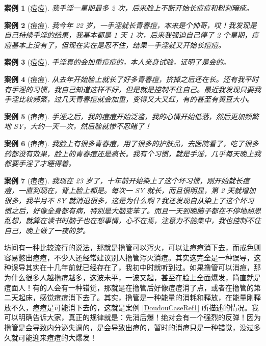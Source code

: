 \documentclass{ctexart}
\newtheorem{case}{案例}
\begin{document}
\begin{case}[痘痘]\it
    我手淫一星期最多 2 次，后来脸上不断开始长痘痘和粉刺暗疮。
\end{case}

\begin{case}[痘痘]\it
    我今年 22 岁，一手淫就长青春痘，本来是个帅哥，哎！我发现是自己持续手淫的结果，我基本都是 1 天 1 次，后来我强迫自己停了 2 个星期，痘痘基本上没有了，但现在实在是忍不住，结果一手淫就又开始长痘痘。
\end{case}

\begin{case}[痘痘]\it
    手淫真的会加重痘痘的，本人亲身试验，证明了是会的。
\end{case}

\begin{case}[痘痘]\it
    从去年开始脸上就长了好多青春痘，挤掉之后还在长。还有我平时有手淫的习惯，我自己知道这样不好，但是就是控制不住自己。最近我发现只要我手淫比较频繁，过几天青春痘就会加重，变得又大又红，有的甚至有黄豆大小。
\end{case}

\begin{case}[痘痘]\it
    手淫之后，我的痘痘开始泛滥，我的心情开始低落，然后更加频繁地 SY，大约一天一次，然后脸就惨不忍睹了！
\end{case}

\begin{case}[痘痘]\it
    我脸上有很多青春痘，用了很多的护肤品，去医院看了，吃了很多药都没有效果，脸上的青春痘还是疯长。我有个习惯，就是手淫，几乎每天晚上我都要手淫了才睡得着。
\end{case}

\begin{case}[痘痘]\it
    我现在 23 岁了，十年前开始染上了这个坏习惯，刚开始就长痘痘，一直到现在，背上脸上都是。每次一 SY 就长，而且很明显，第 2 天就增加很多，我半月不 SY 就消退很多，这是为什么啊？我还发现自从染上了这个坏习惯之后，好像全身都有病，特别是大脑变笨了。而且一天到晚脑子都在不停地胡思乱想，就算在读书时脑子也在想事情，心不在焉，注意力不能集中，我也控制不住自己，晚上做了一夜的梦。
\end{case}

坊间有一种比较流行的说法，那就是撸管可以泻火，可以让痘痘消下去，而戒色则容易憋出痘痘，不少人还经常建议别人撸管泻火消痘。其实这完全是一种误导，这种误导其实在十几年前就已经存在了，我初中时就听到过。如果撸管可以消痘，那为什么很多人越撸痘越多，这波未平，一波又起，甚至在脸上全面爆发，简直就是痘面人！有的人会有一种错觉，那就是在撸管后好像痘痘消了点，或者在撸管的第二天起床，感觉痘痘消下去了。其实，撸管是一种能量的消耗和释放，在能量刚释放不久，痘痘是可能消下去的，这就是案例 \ref{DoudouCaseRef1} 所描述的情况。我可以明确告诉大家，真正的规律就是：先消后爆！绝对会有一个强烈的反弹！因为撸管是会导致内分泌失调的，是会导致出痘的，暂时的消痘只是一种错觉，没过多久就可能迎来痘痘的大爆发！
\end{document}
